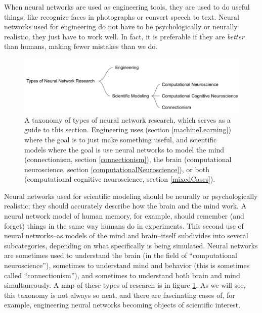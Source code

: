 When neural networks are used as engineering tools, they are used to do useful things, like recognize faces in photographs or convert speech to text. Neural networks used for engineering do not have to be psychologically or neurally realistic, they just have to work well. In fact, it is preferable if they are \emph{better} than humans, making fewer mistakes than we do.

\begin{figure}[h]
\centering
\includegraphics[scale=0.4]{./images/TypesOfNNResearch.png}
\caption[Jeff Yoshimi.]{A taxonomy of types of neural network research, which serves as a guide to this section. Engineering uses (section \ref{machineLearning}) where the goal is to just make something useful, and scientific models where the goal is use neural networks to model the mind (connectionism, section \ref{connectionism}), the brain (computational neuroscience, section \ref{computationalNeuroscience}), or both (computational cognitive neuroscience, section \ref{mixedCases}).}
\label{typesNN}
\end{figure}

Neural networks used for scientific modeling should be neurally or psychologically realistic; they should accurately describe how the brain and the mind work. A neural network model of human memory, for example, should remember (and forget) things in the same way humans do in experiments. This second use of neural networks--as models of the mind and brain--itself subdivides into several subcategories, depending on what specifically is being simulated. Neural networks are sometimes used to understand the brain (in the field of ``computational neuroscience''), sometimes to understand mind and behavior (this is sometimes called ``connectionism''), and sometimes to understand both brain and mind simultaneously. A map of these types of research is in figure \ref{typesNN}. As we will see, this taxonomy is not always so neat, and there are fascinating cases of, for example, engineering neural networks becoming objects of scientific interest.

